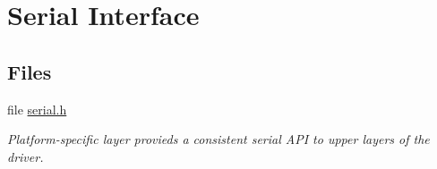 \hypertarget{group__xbee__serial}{\section{Serial Interface}
\label{group__xbee__serial}
}
\subsection*{Files}
\begin{DoxyCompactItemize}
\item 
file \hyperlink{serial_8h}{serial.\-h}
\begin{DoxyCompactList}\small\item\em Platform-\/specific layer provieds a consistent serial A\-P\-I to upper layers of the driver. \end{DoxyCompactList}\end{DoxyCompactItemize}
